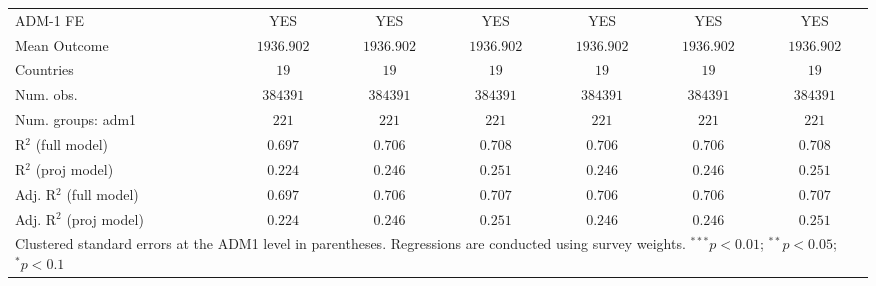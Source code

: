 \begin{table}[htbp]
\begin{center}
\begin{tabular}{l c c c c c c}
ADM-1 FE                & YES           & YES           & YES           & YES           & YES           & YES           \\
Mean Outcome            & $1936.902$    & $1936.902$    & $1936.902$    & $1936.902$    & $1936.902$    & $1936.902$    \\
Countries               & $19$          & $19$          & $19$          & $19$          & $19$          & $19$          \\
Num. obs.               & $384391$      & $384391$      & $384391$      & $384391$      & $384391$      & $384391$      \\
Num. groups: adm1       & $221$         & $221$         & $221$         & $221$         & $221$         & $221$         \\
R$^2$ (full model)      & $0.697$       & $0.706$       & $0.708$       & $0.706$       & $0.706$       & $0.708$       \\
R$^2$ (proj model)      & $0.224$       & $0.246$       & $0.251$       & $0.246$       & $0.246$       & $0.251$       \\
Adj. R$^2$ (full model) & $0.697$       & $0.706$       & $0.707$       & $0.706$       & $0.706$       & $0.707$       \\
Adj. R$^2$ (proj model) & $0.224$       & $0.246$       & $0.251$       & $0.246$       & $0.246$       & $0.251$       \\
\hline
\multicolumn{7}{l}{\scriptsize{Clustered standard errors at the ADM1 level in parentheses. Regressions are conducted using survey weights. $^{***}p<0.01$; $^{**}p<0.05$; $^{*}p<0.1$}}
\end{tabular}
\label{main: tableA12}
\end{center}
\end{table}
